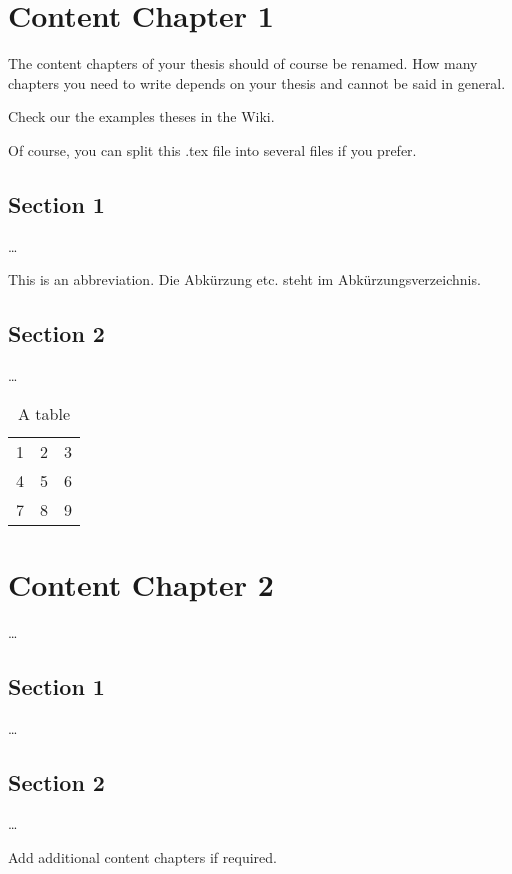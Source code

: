 
\chapter{Content Chapter 1}
\label{ch:Content1}

The content chapters of your thesis should of course be renamed. How many chapters you need to write depends on your thesis and cannot be said in general. 

Check our the examples theses in the Wiki. 

Of course, you can split this .tex file into several files if you prefer. 


\section{Section 1}
\label{ch:Content1:sec:Section1}

\dots

This is an abbreviation.
Die Abkürzung etc. steht im Abkürzungsverzeichnis.


\section{Section 2}
\label{ch:Content1:sec:Section2}

\dots

\begin{table}
\begin{center}
\begin{tabular}{lll}
1 & 2 & 3\\
4 & 5 & 6\\
7 & 8 & 9
\end{tabular}
\end{center}
\caption{A table}
\end{table}






\chapter{Content Chapter 2}
\label{ch:Content2}

\dots


\section{Section 1}
\label{ch:Content2:sec:Section1}

\dots


\section{Section 2}
\label{ch:Content2:sec:Section2}

\dots

Add additional content chapters if required. 